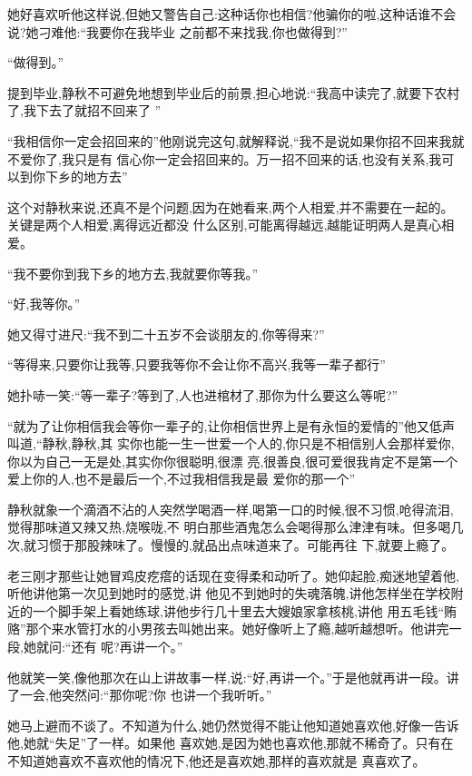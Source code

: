﻿\documentclass[12pt]{article}
\begin{document}
她好喜欢听他这样说,但她又警告自己:这种话你也相信?他骗你的啦,这种话谁不会说?她刁难他:``我要你在我毕业
之前都不来找我,你也做得到?''

``做得到。''

提到毕业,静秋不可避免地想到毕业后的前景,担心地说:``我高中读完了,就要下农村了,我下去了就招不回来了
\myrule ''

``我相信你一定会招回来的\myrule ''他刚说完这句,就解释说,``我不是说如果你招不回来我就不爱你了,我只是有
信心你一定会招回来的。万一招不回来的话,也没有关系,我可以到你下乡的地方去\myrule ''

这个对静秋来说,还真不是个问题,因为在她看来,两个人相爱,并不需要在一起的。关键是两个人相爱,离得远近都没
什么区别,可能离得越远,越能证明两人是真心相爱。

``我不要你到我下乡的地方去,我就要你等我。''

``好,我等你。''

她又得寸进尺:``我\myrule 不到二十五岁不会\myrule 谈朋友的,你等得来?''

``等得来,只要你让我等,只要我等你不会让你不高兴,我等一辈子都行\myrule ''

她扑哧一笑:``等一辈子?等到了,人也进棺材了\myrule ,那你为什么要这么等呢?''

``就为了让你相信我会等你一辈子的,让你相信世界上是有永恒的爱情的\myrule ''他又低声叫道,``静秋,静秋,其
实你也能一生一世爱一个人的,你只是不相信别人会那样爱你,你以为自己一无是处,其实你\myrule 你很聪明,很漂
亮,很善良,很可爱\myrule 很\myrule 我肯定不是第一个\myrule 爱上你的人,也不是最后一个,不过我相信我是最
爱你的那一个\myrule ''

静秋就象一个滴酒不沾的人突然学喝酒一样,喝第一口的时候,很不习惯,呛得流泪,觉得那味道又辣又热,烧喉咙,不
明白那些酒鬼怎么会喝得那么津津有味。但多喝几次,就习惯于那股辣味了。慢慢的,就品出点味道来了。可能再往
下,就要上瘾了。

老三刚才那些让她冒鸡皮疙瘩的话现在变得柔和动听了。她仰起脸,痴迷地望着他,听他讲他第一次见到她时的感觉,讲
他见不到她时的失魂落魄,讲他怎样坐在学校附近的一个脚手架上看她练球,讲他步行几十里去大嫂娘家拿核桃,讲他
用五毛钱``贿赂''那个来水管打水的小男孩去叫她出来。她好像听上了瘾,越听越想听。他讲完一段,她就问:``还有
呢?再讲一个。''

他就笑一笑,像他那次在山上讲故事一样,说:``好,再讲一个。''于是他就再讲一段。讲了一会,他突然问:``那你呢?你
也讲一个我听听。''

她马上避而不谈了。不知道为什么,她仍然觉得不能让他知道她喜欢他,好像一告诉他,她就``失足''了一样。如果他
喜欢她,是因为她也喜欢他,那就不稀奇了。只有在不知道她喜欢不喜欢他的情况下,他还是喜欢她,那样的喜欢就是
真喜欢了。
\end{document}
